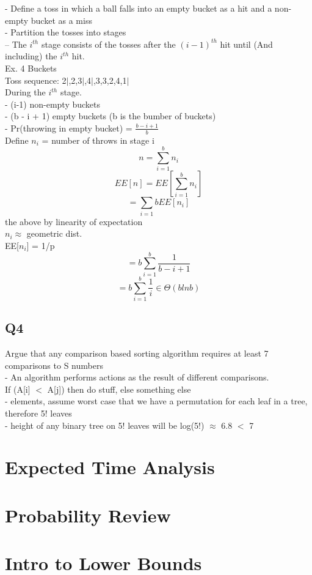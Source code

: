 \documentclass[12pt]{article}
\begin{document}
	- Define a toss in which a ball falls into an empty bucket as a hit and a non-empty bucket as a miss\\
	- Partition the tosses into stages\\
	-- The $i^{th}$ stage consists of the tosses after the $(i-1)^{th}$ hit until (And including) the $i^{th}$ hit.\\
	
	Ex. 4 Buckets\\
	Toss sequence: 2$|$,2,3$|$,4$|$,3,3,2,4,1$|$\\
	
	During the $i^{th}$ stage.\\
	- (i-1) non-empty buckets \\
	- (b - i + 1) empty buckets (b is the bumber of buckets) \\
	- Pr(throwing in empty bucket) = $\frac{b-i+1}{b}$\\
	
	Define $n_i$ = number of throws in stage i\\
	$$n = \sum_{i = 1}^{b}n_i$$
	$$EE[n] = EE[\sum_{i=1}^{b}n_i]$$
	$$= \sum_{i=1}{b}EE[n_i]$$
	the above by linearity of expectation\\
	$n_i \approx$ geometric dist.\\
	EE[$n_i]$ = 1/p\\
	$$= b\sum_{i=1}^{b} \frac{1}{b-i+1}$$
	$$= b\sum_{i=1}^{b}\frac{1}{i} \in \Theta(blnb)$$
	
	\subsection*{Q4}
	Argue that any comparison based sorting algorithm requires at least 7 comparisons to S numbers\\
	
	- An algorithm performs actions as the result of different comparisons.\\
	
	If (A[i] $<$ A[j]) then do stuff, else something else\\
	
	- elements, assume worst case that we have a permutation for each leaf in a tree, therefore 5! leaves\\
	- height of any binary tree on 5! leaves will be log(5!) $\approx$ 6.8 $<$ 7\\
	
	
	
	
	
	\section*{Expected Time Analysis}
	
	\section*{Probability Review}
	
	\section*{Intro to Lower Bounds}
	
	
	
\end{document}
